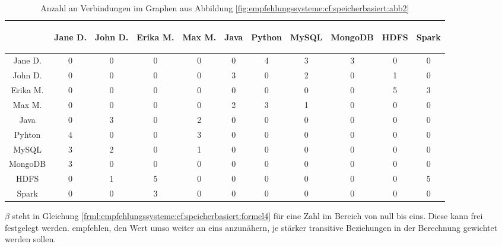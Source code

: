\begin{table}[h]
	\centering
	\begin{tabular}{c|c|c|c|c|c|c|c|c|c|c}
		& \begin{sideways}Jane D.\end{sideways} & \begin{sideways}John D.\end{sideways} & \begin{sideways}Erika M.\end{sideways} & \begin{sideways}Max M.\end{sideways} & \begin{sideways}Java\end{sideways} & \begin{sideways}Python\end{sideways} & \begin{sideways}MySQL\end{sideways} & \begin{sideways}MongoDB\end{sideways} & \begin{sideways}HDFS\end{sideways} & \begin{sideways}Spark\end{sideways} \\
		\hline
		Jane D.  & 0 & 0 & 0 & 0 & 0 & 4 & 3 & 3 & 0 & 0\\
		John D.  & 0 & 0 & 0 & 0 & 3 & 0 & 2 & 0 & 1 & 0\\
		Erika M. & 0 & 0 & 0 & 0 & 0 & 0 & 0 & 0 & 5 & 3\\
		Max M.   & 0 & 0 & 0 & 0 & 2 & 3 & 1 & 0 & 0 & 0\\
		Java     & 0 & 3 & 0 & 2 & 0 & 0 & 0 & 0 & 0 & 0\\
		Pyhton   & 4 & 0 & 0 & 3 & 0 & 0 & 0 & 0 & 0 & 0\\
		MySQL    & 3 & 2 & 0 & 1 & 0 & 0 & 0 & 0 & 0 & 0\\
		MongoDB  & 3 & 0 & 0 & 0 & 0 & 0 & 0 & 0 & 0 & 0\\
		HDFS     & 0 & 1 & 5 & 0 & 0 & 0 & 0 & 0 & 0 & 5\\
		Spark    & 0 & 0 & 3 & 0 & 0 & 0 & 0 & 0 & 0 & 0
	\end{tabular}
	\caption{Anzahl an Verbindungen im Graphen aus Abbildung \ref{fig:empfehlungssysteme:cf:speicherbasiert:abb2}}
	\label{tbl:empfehlungssysteme:arbeitsweise:tbl2}
\end{table}

$\beta$ steht in Gleichung \ref{frml:empfehlungssysteme:cf:speicherbasiert:formel4} für eine Zahl im Bereich von null bis eins. Diese kann frei festgelegt werden. \textcite{huang:2004} empfehlen, den Wert umso weiter an eins anzunähern, je stärker transitive Beziehungen in der Berechnung gewichtet werden sollen.

